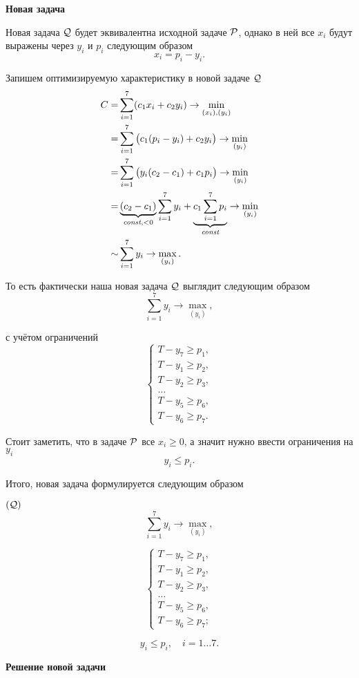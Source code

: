 \bigskip

\textbf{Новая задача}

Новая задача $\Q$ будет эквивалентна исходной задаче $\P$, однако в ней все $x_i$ будут выражены через $y_i$ и $p_i$ следующим образом
\[
x_i = p_i - y_i.
\]

Запишем оптимизируемую характеристику в новой задаче $\Q$
\begin{align*}
	C =& \sum_{i=1}^7 (c_1 x_i + c_2 y_i) \to \min_{(x_i), (y_i)} \\
	=& \sum_{i=1}^7 \big(c_1 (p_i - y_i) + c_2 y_i\big) \to \min_{(y_i)} \\
	=&  \sum_{i=1}^7 \big(y_i (c_2 - c_1) + c_1 p_i\big) \to \min_{(y_i)} \\
	=& \underbrace{(c_2 - c_1)}_{\const, <0} \sum_{i=1}^7 y_i + \underbrace{c_1 \sum_{i=1}^{7} p_i}_{\const} \to \min_{(y_i)} \\
	\sim& \sum_{i=1}^7 y_i \to \max_{(y_i)}.
\end{align*}

То есть фактически наша новая задача $\Q$ выглядит следующим образом
\[
\sum_{i=1}^7 y_i \to \max_{(y_i)},
\]

с учётом ограничений
\[
\begin{cases}
	T - y_7 \ge p_1, \\
	T - y_1 \ge p_2, \\
	T - y_2 \ge p_3, \\
	\dots \\
	T - y_5 \ge p_6, \\
	T - y_6 \ge p_7.
\end{cases}
\]

Стоит заметить, что в задаче $\P$ все $x_i \ge 0$, а значит нужно ввести ограничения на $y_i$
\[
	y_i \le p_i.
\]

Итого, новая задача формулируется следующим образом

$(\Q)$ 
\[
\sum_{i=1}^7 y_i \to \max_{(y_i)},
\]

\[
\begin{cases}
	T - y_7 \ge p_1, \\
	T - y_1 \ge p_2, \\
	T - y_2 \ge p_3, \\
	\dots \\
	T - y_5 \ge p_6, \\
	T - y_6 \ge p_7;
\end{cases}
\]

\[
y_i \le p_i, \quad i = 1 \dots 7.
\]

\textbf{Решение новой задачи}


